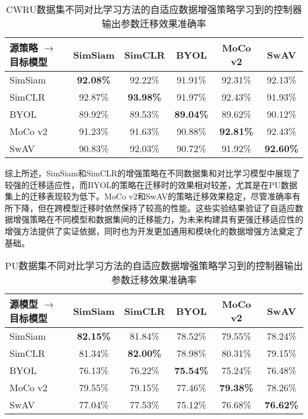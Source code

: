 \documentclass[master]{thesis-uestc}
\begin{document}
\begin{table}[h]
    \centering
    \caption{CWRU数据集不同对比学习方法的自适应数据增强策略学习到的控制器输出参数迁移效果准确率}
    \renewcommand\arraystretch{1.3}
    \begin{tabular}{lccccc}
        \toprule
        源策略 $\rightarrow$ 目标模型 & SimSiam & SimCLR & BYOL & MoCo v2 & SwAV \\
        \midrule
        SimSiam    & \textbf{92.08\%} & 92.22\% & 91.91\% & 92.31\% & 92.13\% \\
        SimCLR     & 92.87\% & \textbf{93.98\%} & 91.97\% & 92.43\% & 91.93\% \\
        BYOL       & 89.92\% & 89.53\% & \textbf{89.04\%} & 89.62\% & 90.12\% \\
        MoCo v2    & 91.23\% & 91.63\% & 90.88\% & \textbf{92.81\%} & 92.43\% \\
        SwAV       & 90.83\% & 92.03\% & 90.72\% & 91.92\% & \textbf{92.60\%} \\
        \bottomrule
    \end{tabular}
    \label{tab:autoaugment_transfer_estimation}
\end{table}

综上所述，SimSiam和SimCLR的增强策略在不同数据集和对比学习模型中展现了较强的迁移适应性，而BYOL的策略在迁移时的效果相对较差，尤其是在PU数据集上的迁移表现较为低下。MoCo v2和SwAV的策略迁移效果稳定，尽管准确率有所下降，但在跨模型迁移时依然保持了较高的性能。这些实验结果验证了自适应数据增强策略在不同模型和数据集间的迁移能力，为未来构建具有更强迁移适应性的增强方法提供了实证依据，同时也为开发更加通用和模块化的数据增强方法奠定了基础。

\begin{table}[h]
    \centering
    \caption{PU数据集不同对比学习方法的自适应数据增强策略学习到的控制器输出参数迁移效果准确率}
    \renewcommand\arraystretch{1.3}
    \begin{tabular}{lccccc}
        \toprule
        源模型 $\rightarrow$ 目标模型 & SimSiam & SimCLR & BYOL & MoCo v2 & SwAV \\
        \midrule
        SimSiam    & \textbf{82.15\%} & 81.84\% & 78.52\% & 79.55\% & 78.24\% \\
        SimCLR     & 81.34\% & \textbf{82.00\%} & 78.98\% & 80.31\% & 79.15\% \\
        BYOL       & 76.13\% & 76.22\% & \textbf{75.54\%} & 75.24\% & 76.48\% \\
        MoCo v2    & 79.55\% & 79.15\% & 77.46\% & \textbf{79.38\%} & 78.26\% \\
        SwAV       & 77.04\% & 77.53\% & 75.12\% & 76.68\% & \textbf{76.62\%} \\
        \bottomrule
    \end{tabular}
    \label{tab:autoaugment_transfer_estimation_pu}
\end{table}
\end{document}
